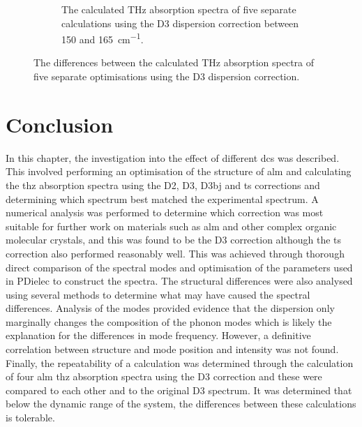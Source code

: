 \begin{figure}
\begin{subfigure}{\textwidth}
    \caption{The calculated THz absorption spectra of five separate calculations using the D3 dispersion correction between 150 and \SI{165}{cm^{-1}}.}
    \label{fig:simstudy3}
\end{subfigure}
\captionsetup{font = footnotesize, justification = centering}
\caption[The Differences between the Calculated Terahertz Absorption Spectra of five Optimisations using the D3 Dispersion Correction]{The differences between the calculated THz absorption spectra of five separate optimisations using the D3 dispersion correction.}
\label{fig:mode_dissim}
\end{figure}


\section{Conclusion}
In this chapter, the investigation into the effect of different \acrshort{dc}s was described. This involved performing an optimisation of the structure of \acrshort{alm} and calculating the \acrshort{thz} absorption spectra using the D2, D3, D3\acrshort{bj} and \acrshort{ts} corrections and determining which spectrum best matched the experimental spectrum. A numerical analysis was performed to determine which correction was most suitable for further work on materials such as \acrshort{alm} and other complex organic molecular crystals, and this was found to be the D3 correction although the \acrshort{ts} correction also performed reasonably well. This was achieved through thorough direct comparison of the spectral modes and optimisation of the parameters used in PDielec to construct the spectra. The structural differences were also analysed using several methods to determine what may have caused the spectral differences. Analysis of the modes provided evidence that the dispersion only marginally changes the composition of the phonon modes which is likely the explanation for the differences in mode frequency. However, a definitive correlation between structure and mode position and intensity was not found.
Finally, the repeatability of a calculation was determined through the calculation of four \acrshort{alm} \acrshort{thz} absorption spectra using the D3 correction and these were compared to each other and to the original D3 spectrum. It was determined that below the dynamic range of the system, the differences between these calculations is tolerable.




